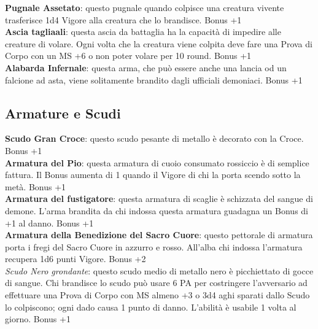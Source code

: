 \documentclass[12pt,a4paper,twoside,openany]{book}
\begin{document}
\begin{multicols}{2}
\textbf{Pugnale Assetato}: questo pugnale quando colpisce una creatura vivente trasferisce 1d4 Vigore alla creatura che lo brandisce. Bonus +1\\

\textbf{Ascia tagliaali}: questa ascia da battaglia ha la capacità di impedire alle creature di volare. Ogni volta che la creatura viene colpita deve fare una Prova di Corpo con un MS +6 o non poter volare per 10 round. Bonus +1\\

\textbf{Alabarda Infernale}: questa arma, che può essere anche una lancia od un falcione ad asta, viene solitamente brandito dagli ufficiali demoniaci. Bonus +1

\subsection{Armature e Scudi}

\textbf{Scudo Gran Croce}: questo scudo pesante di metallo è decorato con la Croce. Bonus +1\\

\textbf{Armatura del Pio}: questa armatura di cuoio consumato rossiccio è di semplice fattura. Il Bonus aumenta di 1 quando il Vigore di chi la porta scendo sotto la metà. Bonus +1\\

\textbf{Armatura del fustigatore}: questa armatura di scaglie è schizzata del sangue di demone. L'arma brandita da chi indossa questa armatura guadagna un Bonus di +1 al danno. Bonus +1\\

\textbf{Armatura della Benedizione del Sacro Cuore}: questo pettorale di armatura porta i fregi del Sacro Cuore in azzurro e rosso. All'alba chi indossa l'armatura recupera 1d6 punti Vigore. Bonus +2\\

\textit{Scudo Nero grondante}: questo scudo medio di metallo nero è picchiettato di gocce di sangue. Chi brandisce lo scudo può usare 6 PA per costringere l'avversario ad effettuare una Prova di Corpo con MS almeno +3 o 3d4 aghi sparati dallo Scudo lo colpiscono; ogni dado causa 1 punto di danno. L'abilità è usabile 1 volta al giorno. Bonus +1\\


\end{multicols}
\end{document}
